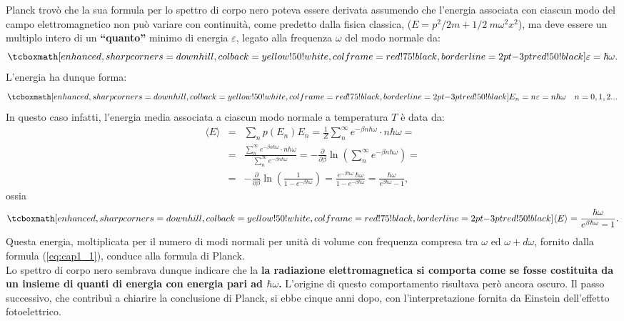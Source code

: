 \documentclass[a4paper,12pt,oneside]{book}
\begin{document}
Planck trovò che la sua formula  per lo spettro di corpo nero poteva essere derivata assumendo che l'energia associata con ciascun modo del campo elettromagnetico non può variare con continuità, come predetto dalla fisica classica, ($E= p^2/2m +1/2 \ m \omega ^2 x^2$), ma deve essere un multiplo intero di un \textbf{``quanto''} minimo di energia $\varepsilon$, legato alla frequenza $\omega$ del modo normale da:
	\begin{equation}
		\tcboxmath[enhanced,sharp corners=downhill ,colback=yellow!50!white,colframe=red!75!black, borderline={2pt}{-3pt}{red!50!black}]{
			\varepsilon = \hbar \omega .
			}
	\end{equation}
L'energia ha dunque forma:
	\begin{equation}
	\tcboxmath[enhanced,sharp corners=downhill ,colback=yellow!50!white,colframe=red!75!black, borderline={2pt}{-3pt}{red!50!black}]{
		E_n = n\varepsilon = n \hbar \omega \quad n= 0,1,2...
		}
\end{equation}
In questo caso infatti, l'energia media associata a ciascun modo normale a temperatura $T$ è data da:
	\begin{eqnarray}
		\langle E \rangle &=&\sum _n p(E_n) E_n =\frac{1}{Z}\sum _n ^{\infty} e^{-\beta n \hbar \omega} \cdot n\hbar \omega = \nonumber \\
		&=&\frac{\sum _n ^{\infty} e^{-\beta n \hbar \omega} \cdot n\hbar \omega}{\sum _n ^{\infty} e^{-\beta n \hbar \omega}}= - \frac{\partial}{\partial \beta} \ln \left( \sum _n ^{\infty} e^{-\beta n \hbar \omega}\right)= \nonumber \\
		&=&- \frac{\partial}{\partial \beta} \ln \left( \frac{1}{1- e^{-\beta \hbar \omega}}\right)=  \frac{e^{-\beta \hbar \omega}\ \hbar \omega}{1-e^{-\beta \hbar \omega}}= \frac{ \hbar \omega}{e^{\beta \hbar \omega}-1},
	\end{eqnarray}
ossia
	\begin{equation}
		\tcboxmath[enhanced,sharp corners=downhill ,colback=yellow!50!white,colframe=red!75!black, borderline={2pt}{-3pt}{red!50!black}]{
			\langle E \rangle = \frac{ \hbar \omega}{e^{\beta \hbar \omega}-1}.
			}
	\end{equation}
Questa energia, moltiplicata per il numero di modi normali per unità di volume con frequenza compresa tra $\omega$ ed $\omega + d\omega$, fornito dalla formula (\ref{eq:cap1_1}), conduce alla formula di Planck.\\

Lo spettro di corpo nero sembrava dunque indicare che la \textbf{la radiazione elettromagnetica si comporta come se fosse costituita da un insieme di quanti di energia con energia pari ad $\hbar \omega $.}
L'origine di questo comportamento risultava però ancora oscuro. Il passo successivo, che contribuì a chiarire la conclusione di Planck, si ebbe cinque anni dopo, con l'interpretazione fornita da Einstein dell'effetto fotoelettrico.
\end{document}
